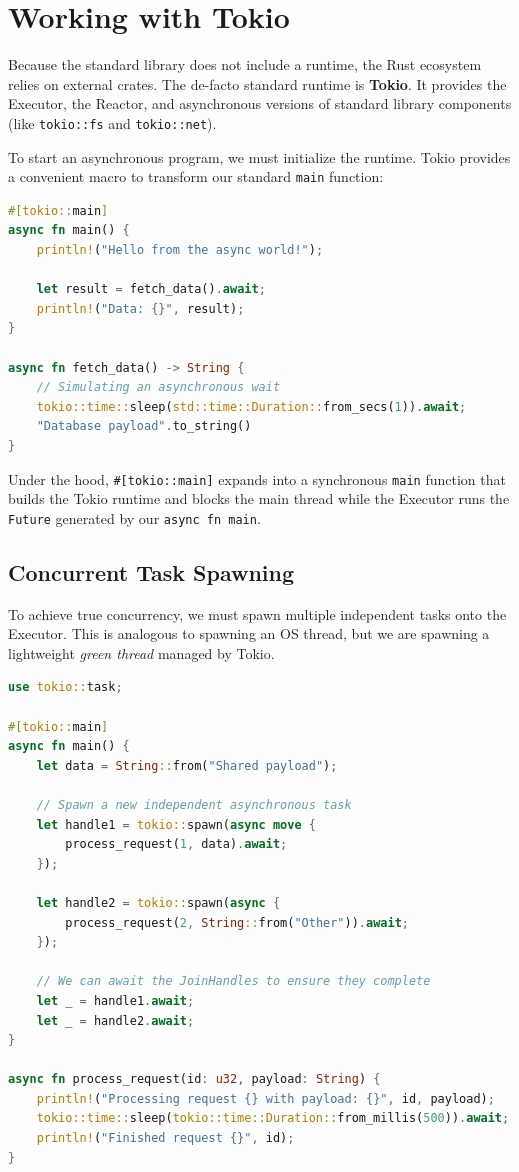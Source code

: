 \section{Working with Tokio}

Because the standard library does not include a runtime, the Rust ecosystem relies on external crates. The de-facto standard runtime is \textbf{Tokio}. It provides the Executor, the Reactor, and asynchronous versions of standard library components (like \texttt{tokio::fs} and \texttt{tokio::net}).

To start an asynchronous program, we must initialize the runtime. Tokio provides a convenient macro to transform our standard \texttt{main} function:

\begin{lstlisting}[language=Rust]
#[tokio::main]
async fn main() {
    println!("Hello from the async world!");
    
    let result = fetch_data().await;
    println!("Data: {}", result);
}

async fn fetch_data() -> String {
    // Simulating an asynchronous wait
    tokio::time::sleep(std::time::Duration::from_secs(1)).await;
    "Database payload".to_string()
}
\end{lstlisting}

Under the hood, \texttt{\#[tokio::main]} expands into a synchronous \texttt{main} function that builds the Tokio runtime and blocks the main thread while the Executor runs the \texttt{Future} generated by our \texttt{async fn main}.

\subsection{Concurrent Task Spawning}

To achieve true concurrency, we must spawn multiple independent tasks onto the Executor. This is analogous to spawning an OS thread, but we are spawning a lightweight \textit{green thread} managed by Tokio.

\begin{lstlisting}[language=Rust]
use tokio::task;

#[tokio::main]
async fn main() {
    let data = String::from("Shared payload");
    
    // Spawn a new independent asynchronous task
    let handle1 = tokio::spawn(async move {
        process_request(1, data).await;
    });

    let handle2 = tokio::spawn(async {
        process_request(2, String::from("Other")).await;
    });

    // We can await the JoinHandles to ensure they complete
    let _ = handle1.await;
    let _ = handle2.await;
}

async fn process_request(id: u32, payload: String) {
    println!("Processing request {} with payload: {}", id, payload);
    tokio::time::sleep(tokio::time::Duration::from_millis(500)).await;
    println!("Finished request {}", id);
}
\end{lstlisting}

